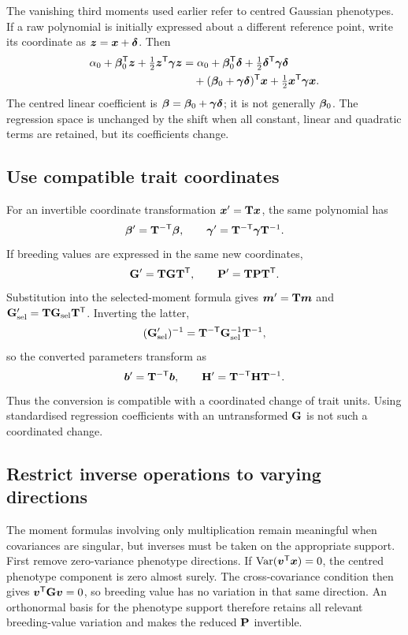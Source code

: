 The vanishing third moments used earlier refer to centred Gaussian
phenotypes. If a raw polynomial is initially expressed about a different
reference point, write its coordinate as \(\boldsymbol{z}=\boldsymbol{x}+\boldsymbol{\delta}\).
Then
\begin{align*}
 \alpha_0+\boldsymbol{\beta}_0^{\mathsf T}\boldsymbol{z}
       +\tfrac12\boldsymbol{z}^{\mathsf T}\boldsymbol{\gamma}\boldsymbol{z}
 &=\alpha_0+\boldsymbol{\beta}_0^{\mathsf T}\boldsymbol{\delta}
       +\tfrac12\boldsymbol{\delta}^{\mathsf T}\boldsymbol{\gamma}\boldsymbol{\delta}\\
 &\quad+(\boldsymbol{\beta}_0+\boldsymbol{\gamma}\boldsymbol{\delta})^{\mathsf T}\boldsymbol{x}
       +\tfrac12\boldsymbol{x}^{\mathsf T}\boldsymbol{\gamma}\boldsymbol{x}.
\end{align*}
The centred linear coefficient is
\(\boldsymbol{\beta}=\boldsymbol{\beta}_0+\boldsymbol{\gamma}\boldsymbol{\delta}\); it is not generally
\(\boldsymbol{\beta}_0\). The regression space is unchanged by the shift when all
constant, linear and quadratic terms are retained, but its coefficients
change.

\subsection{Use compatible trait coordinates}

For an invertible coordinate transformation \(\boldsymbol{x}'=\mathbf{T}\boldsymbol{x}\),
the same polynomial has
\[
 \boldsymbol{\beta}'=\mathbf{T}^{-\mathsf T}\boldsymbol{\beta},\qquad
 \boldsymbol{\gamma}'=\mathbf{T}^{-\mathsf T}\boldsymbol{\gamma}\mathbf{T}^{-1}.
\]
If breeding values are expressed in the same new coordinates,
\[
 \mathbf{G}'=\mathbf{T}\mathbf{G}\mathbf{T}^{\mathsf T},\qquad
 \mathbf{P}'=\mathbf{T}\mathbf{P}\mathbf{T}^{\mathsf T}.
\]
Substitution into the selected-moment formula gives
\(\boldsymbol{m}'=\mathbf{T}\boldsymbol{m}\) and
\(\mathbf{G}_{\mathrm{sel}}'=\mathbf{T}\mathbf{G}_{\mathrm{sel}}\mathbf{T}^{\mathsf T}\). Inverting the latter,
\[
 (\mathbf{G}_{\mathrm{sel}}')^{-1}
 =\mathbf{T}^{-\mathsf T}\mathbf{G}_{\mathrm{sel}}^{-1}\mathbf{T}^{-1},
\]
so the converted parameters transform as
\[
 \boldsymbol{b}'=\mathbf{T}^{-\mathsf T}\boldsymbol{b},\qquad
 \mathbf{H}'=\mathbf{T}^{-\mathsf T}\mathbf{H}\mathbf{T}^{-1}.
\]
Thus the conversion is compatible with a coordinated change of trait units.
Using standardised regression coefficients with an untransformed
\(\mathbf{G}\) is not such a coordinated change.

\subsection{Restrict inverse operations to varying directions}
\label{conversion:support}

The moment formulas involving only multiplication remain meaningful when
covariances are singular, but inverses must be taken on the appropriate
support. First remove zero-variance phenotype directions. If
\(\operatorname{Var}(\boldsymbol{v}^{\mathsf T}\boldsymbol{x})=0\), the centred phenotype component is
zero almost surely. The cross-covariance condition then gives
\(\boldsymbol{v}^{\mathsf T}\mathbf{G}\boldsymbol{v}=0\), so breeding value has no variation
in that same direction. An orthonormal basis for the phenotype support
therefore retains all relevant breeding-value variation and makes the
reduced \(\mathbf{P}\) invertible.

